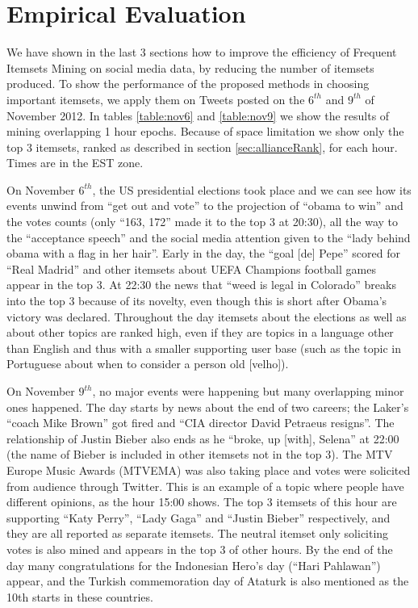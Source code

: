\documentclass{sig-alternate}
\begin{document}
\section{Empirical Evaluation}
\label{sec:empirical}
We have shown in the last 3 sections how to improve the efficiency of Frequent Itemsets Mining on social media data, by reducing the number of itemsets produced. To show the performance of the proposed methods in 
choosing important itemsets, we apply them on Tweets posted on the $6^{th}$ and $9^{th}$ of November 2012. In tables \ref{table:nov6} and \ref{table:nov9} we show the results of mining overlapping 1 hour epochs. Because of space limitation we show only the top 3 itemsets, ranked as described in section \ref{sec:allianceRank}, for each hour. Times are in the EST zone.

On November $6^{th}$, the US presidential elections took place and we can see how its events unwind from ``get out and vote'' to the projection of ``obama to win'' and the votes counts (only ``163, 172'' made it to the top 3 at 20:30), all the way to the ``acceptance speech'' and the social media attention given to the ``lady behind obama  with a flag in her hair''. Early in the day, the ``goal [de] Pepe'' scored for ``Real Madrid'' and other itemsets about UEFA Champions football games appear in the top 3. At 22:30 the news that ``weed is legal in Colorado'' breaks into the top 3 because of its novelty, even though this is short after Obama's victory was declared. Throughout the day itemsets about the elections as well as about other topics are ranked high, even if they are topics in a language other than English and thus with a smaller supporting user base (such as the topic in Portuguese about when to consider a person old [velho]).

On November $9^{th}$, no major events were happening but many overlapping minor ones happened. The day starts by news about the end of two careers; the Laker's ``coach Mike Brown'' got fired  and ``CIA director David Petraeus resigns''. The relationship of Justin Bieber also ends as he ``broke, up [with], Selena'' at 22:00 (the name of  Bieber is included in other itemsets  not in the top 3). The MTV Europe Music Awards (MTVEMA) was also taking place and votes were solicited from audience through Twitter. This is an example of a topic where people have different opinions, as the hour 15:00 shows. The top 3 itemsets of this hour are supporting ``Katy  Perry'', ``Lady Gaga'' and ``Justin Bieber'' respectively, and they are all reported as separate itemsets. The neutral itemset only soliciting votes is also mined and appears in the top 3 of other hours. By the end of the day many congratulations for the Indonesian Hero's day (``Hari Pahlawan'') appear, and the Turkish commemoration day of Ataturk is also mentioned as the 10th starts in these countries. 
\end{document}
